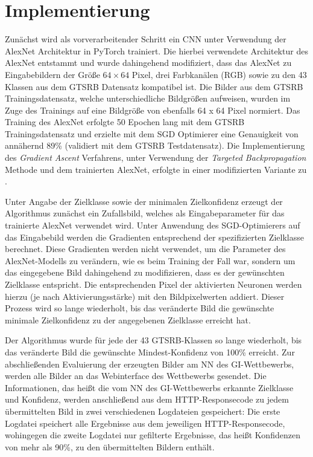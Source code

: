 \section{Implementierung}

Zunächst wird als vorverarbeitender Schritt ein \ac{CNN} unter Verwendung der AlexNet Architektur in PyTorch trainiert. 
Die hierbei verwendete Architektur des AlexNet entstammt \cite{pytorch_datasets_2019} und wurde dahingehend modifiziert, dass das AlexNet zu Eingabebildern der Größe $64 \times 64$ Pixel, drei Farbkanälen (RGB) sowie zu den 43 Klassen aus dem \ac{GTSRB} Datensatz kompatibel ist. 
Die Bilder aus dem \ac{GTSRB} Trainingsdatensatz, welche unterschiedliche Bildgrößen aufweisen, wurden im Zuge des Trainings auf eine Bildgröße von ebenfalls 64 x 64 Pixel normiert. 
Das Training des AlexNet erfolgte 50 Epochen lang mit dem \ac{GTSRB} Trainingsdatensatz und erzielte mit dem \ac{SGD} Optimierer eine Genauigkeit von annähernd 89\% (validiert mit dem \ac{GTSRB} Testdatensatz).
Die Implementierung des \textit{Gradient Ascent} Verfahrens, unter Verwendung der \textit{Targeted Backpropagation} Methode und dem trainierten AlexNet, erfolgte in einer modifizierten Variante zu \cite{ozbulak_pytorch_2019}. 

Unter Angabe der Zielklasse sowie der minimalen Zielkonfidenz erzeugt der Algorithmus zunächst ein Zufallsbild, welches als Eingabeparameter für das trainierte AlexNet verwendet wird. Unter Anwendung des SGD-Optimierers auf das Eingabebild werden die Gradienten entsprechend der spezifizierten Zielklasse berechnet. 
Diese Gradienten werden nicht verwendet, um die Parameter des AlexNet-Modells zu verändern, wie es beim Training der Fall war, sondern um das eingegebene Bild dahingehend zu modifizieren, dass es der gewünschten Zielklasse entspricht. 
Die entsprechenden Pixel der aktivierten Neuronen werden hierzu (je nach Aktivierungsstärke) mit den Bildpixelwerten addiert. 
Dieser Prozess wird so lange wiederholt, bis das veränderte Bild die gewünschte minimale Zielkonfidenz zu der angegebenen Zielklasse erreicht hat.

Der Algorithmus wurde für jede der 43 \ac{GTSRB}-Klassen so lange wiederholt, bis das veränderte Bild die gewünschte Mindest-Konfidenz von 100\% erreicht.
Zur abschließenden Evaluierung der erzeugten Bilder am \ac{NN} des \ac{GI}-Wettbewerbs, werden alle Bilder an das Webinterface des Wettbewerbs gesendet. Die Informationen, das heißt die vom \ac{NN} des \ac{GI}-Wettbewerbs erkannte Zielklasse und Konfidenz, werden anschließend aus dem HTTP-Responsecode zu jedem übermittelten Bild in zwei verschiedenen Logdateien gespeichert: Die erste Logdatei speichert alle Ergebnisse aus dem jeweiligen HTTP-Responsecode, wohingegen die zweite Logdatei nur gefilterte Ergebnisse, das heißt Konfidenzen von mehr als 90\%, zu den übermittelten Bildern enthält.




